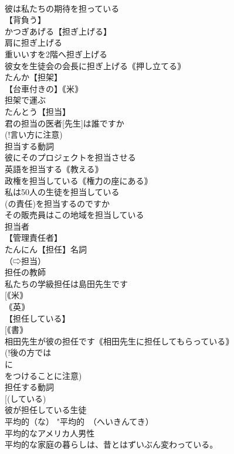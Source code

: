 \documentclass[8pt]{extreport}
\begin{document}
\begin{CJK}{UTF8}{min}
\\	彼は私たちの期待を担っている
\\	【背負う】
\\	かつぎあげる【担ぎ上げる】
\\	肩に担ぎ上げる
\\	重いいすを2階へ担ぎ上げる
\\	彼女を生徒会の会長に担ぎ上げる｟押し立てる｠
\\	たんか【担架】
\\	【台車付きの】｟米｠
\\	担架で運ぶ
\\	たんとう【担当】
\\	君の担当の医者[先生]は誰ですか
\\	(!言い方に注意)
\\	担当する動詞
\\	彼にそのプロジェクトを担当させる
\\	英語を担当する｟教える｠
\\	政権を担当している｟権力の座にある｠
\\	私は50人の生徒を担当している
\\	[｟書｠ 
\\	（⇨担任）
\\	だれがその実験[部門](の責任)を担当するのですか
\\	その販売員はこの地域を担当している
\\	担当者
\\	【管理責任者】
\\	たんにん【担任】名詞
\\	（⇨担当）
\\	担任の教師
\\	私たちの学級担任は島田先生です
\\	[｟米｠ 
\\	｟英｠ 
\\	【担任している】
\\	[｟書｠ 
\\	相田先生が彼の担任です｟相田先生に担任してもらっている｠
\\	(!後の方では 
\\	に 
\\	をつけることに注意)
\\	担任する動詞
\\	[(している) 
\\	彼が担任している生徒
\\	平均的（な）		"平均的　（へいきんてき）
\\	平均的なアメリカ人男性
\\	平均的な家庭の暮らしは、昔とはずいぶん変わっている。

\end{CJK}
\end{document}
